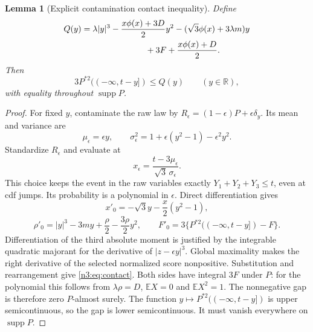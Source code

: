 \documentclass[11pt,a4paper]{article}
\numberwithin{equation}{section}
\newtheorem{lemma}[theorem]{Lemma}
\theoremstyle{definition}
\theoremstyle{remark}
\newcommand{\E}{\mathbb E}
\newcommand{\R}{\mathbb R}
\DeclareMathOperator{\supp}{supp}
\begin{document}
\begin{lemma}[Explicit contamination contact inequality]\label{n3:lem:contact}
Define
\begin{align}
 Q(y)={}&\lambda|y|^3-\frac{x\phi(x)+3D}{2}y^2
 -(\sqrt3\phi(x)+3\lambda m)y \notag\\
 &\hspace{22mm}+3F+\frac{x\phi(x)+D}{2}.
 \label{n3:eq:Q}
\end{align}
Then
\begin{equation}\label{n3:eq:contact}
 3P^{*2}(( -\infty,t-y])\le Q(y)\qquad(y\in\R),
\end{equation}
with equality throughout $\supp P$.
\end{lemma}
\begin{proof}
For fixed $y$, contaminate the raw law by
$R_\epsilon=(1-\epsilon)P+\epsilon\delta_y$. Its mean and variance are
\[
 \mu_\epsilon=\epsilon y,\qquad
 \sigma_\epsilon^2=1+\epsilon(y^2-1)-\epsilon^2y^2.
\]
Standardize $R_\epsilon$ and evaluate at
\[
 x_\epsilon=\frac{t-3\mu_\epsilon}{\sqrt3\,\sigma_\epsilon}.
\]
This choice keeps the event in the raw variables exactly
$Y_1+Y_2+Y_3\le t$, even at cdf jumps. Its probability is a polynomial
in $\epsilon$. Direct differentiation gives
\[
 x'_0=-\sqrt3 y-\frac x2(y^2-1),
\]
\[
 \rho'_0=|y|^3-3my+\frac\rho2-\frac{3\rho}{2}y^2,
\qquad
 F'_0=3\{P^{*2}(( -\infty,t-y])-F\}.
\]
Differentiation of the third absolute moment is justified by the integrable
quadratic majorant for the derivative of $|z-\epsilon y|^3$.
Global maximality makes the right derivative of the selected normalized
score nonpositive. Substitution and rearrangement give \eqref{n3:eq:contact}.
Both sides have integral $3F$ under $P$: for the polynomial this follows
from $\lambda\rho=D$, $\E X=0$ and $\E X^2=1$.
The nonnegative gap is therefore zero $P$-almost surely. The function
$y\mapsto P^{*2}(( -\infty,t-y])$ is upper semicontinuous, so the gap is
lower semicontinuous. It must vanish everywhere on $\supp P$.
\end{proof}
\end{document}
